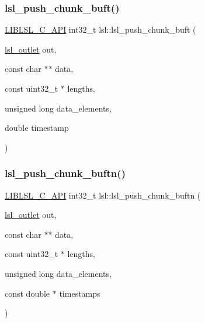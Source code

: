 \mbox{\label{namespacelsl_a9689fe506da978719b80fe5ee61d355b}} 
\subsubsection{\texorpdfstring{lsl\+\_\+push\+\_\+chunk\+\_\+buft()}{lsl\_push\_chunk\_buft()}}
{\footnotesize\ttfamily \hyperlink{lsl__cpp_8h_aafd0ef1813e8be84a1420c4f1df64615}{L\+I\+B\+L\+S\+L\+\_\+\+C\+\_\+\+A\+PI} int32\+\_\+t lsl\+::lsl\+\_\+push\+\_\+chunk\+\_\+buft (\begin{DoxyParamCaption}\item[{\hyperlink{namespacelsl_abcf512b0f66dacf86c10b165995fd50b}{lsl\+\_\+outlet}}]{out,  }\item[{const char $\ast$$\ast$}]{data,  }\item[{const uint32\+\_\+t $\ast$}]{lengths,  }\item[{unsigned long}]{data\+\_\+elements,  }\item[{double}]{timestamp }\end{DoxyParamCaption})}

\mbox{\label{namespacelsl_af90cd85058ec6f055bd1f59f8271c5c4}} 
\subsubsection{\texorpdfstring{lsl\+\_\+push\+\_\+chunk\+\_\+buftn()}{lsl\_push\_chunk\_buftn()}}
{\footnotesize\ttfamily \hyperlink{lsl__cpp_8h_aafd0ef1813e8be84a1420c4f1df64615}{L\+I\+B\+L\+S\+L\+\_\+\+C\+\_\+\+A\+PI} int32\+\_\+t lsl\+::lsl\+\_\+push\+\_\+chunk\+\_\+buftn (\begin{DoxyParamCaption}\item[{\hyperlink{namespacelsl_abcf512b0f66dacf86c10b165995fd50b}{lsl\+\_\+outlet}}]{out,  }\item[{const char $\ast$$\ast$}]{data,  }\item[{const uint32\+\_\+t $\ast$}]{lengths,  }\item[{unsigned long}]{data\+\_\+elements,  }\item[{const double $\ast$}]{timestamps }\end{DoxyParamCaption})}


